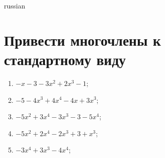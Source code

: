 \documentclass[a4paper]{article}
\begin{document}
\begin{otherlanguage*}{russian}

\section{Привести многочлены к стандартному виду}
\begin{enumerate}
\item $-x - 3 - 3x^2 + 2x^3 - 1$;
\item $-5 - 4x^3 + 4x^4 - 4x + 3x^3$;
\item $-5x^2 + 3x^4 - 3x^3 - 3 - 5x^4$;
\item $-5x^2 + 2x^4 - 2x^3 + 3 + x^3$;
\item $-3x^4 + 3x^3 - 4x^4$;
\end{enumerate}
\end{otherlanguage*}
\end{document}
